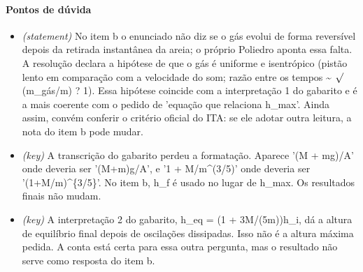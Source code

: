 \documentclass{article}%
\begin{document}
\paragraph{Pontos de dúvida}%
\begin{itemize}%
\item%
\textit{(statement)} No item b o enunciado não diz se o gás evolui de forma reversível depois da retirada instantânea da areia; o próprio Poliedro aponta essa falta. A resolução declara a hipótese de que o gás é uniforme e isentrópico (pistão lento em comparação com a velocidade do som; razão entre os tempos \textasciitilde{} $\surd$(m\_gás/m) ? 1). Essa hipótese coincide com a interpretação 1 do gabarito e é a mais coerente com o pedido de 'equação que relaciona h\_max'. Ainda assim, convém conferir o critério oficial do ITA: se ele adotar outra leitura, a nota do item b pode mudar.%
\item%
\textit{(key)} A transcrição do gabarito perdeu a formatação. Aparece '(M + mg)/A' onde deveria ser '(M+m)g/A', e '1 + M/m\^{}(3/5)' onde deveria ser '(1+M/m)\^{}\{3/5\}'. No item b, h\_f é usado no lugar de h\_max. Os resultados finais não mudam.%
\item%
\textit{(key)} A interpretação 2 do gabarito, h\_eq = (1 + 3M/(5m))h\_i, dá a altura de equilíbrio final depois de oscilações dissipadas. Isso não é a altura máxima pedida. A conta está certa para essa outra pergunta, mas o resultado não serve como resposta do item b.%
\end{itemize}%
\end{document}

